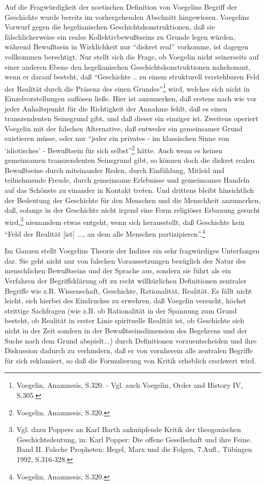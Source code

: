 Auf die Fragwürdigkeit der noetischen Definition von Voegelins Begriff der
Geschichte wurde bereits im vorhergehenden Abschnitt hingewiesen. Voegelins
Vorwurf gegen die hegelianischen Geschichtskonstruktionen, daß sie
fälschlicherweise ein reales Kollektivbewußtseins zu Grunde legen würden,
während Bewußtsein in Wirklichkeit nur "`diskret real"' vorkomme, ist dagegen
vollkommen berechtigt. Nur stellt sich die Frage, ob Voegelin nicht
seinerseits auf einer anderen Ebene den hegelianischen
Geschichtskonstruktionen nahekommt, wenn er darauf besteht, daß "`Geschichte
.. zu einem strukturell verstehbaren Feld der Realität durch die Präsenz des
einen Grundes"'\footnote{Voegelin, Anamnesis, S.320. - Vgl. auch Voegelin,
  Order and History IV, S.305.} wird, welches sich nicht in
Einzelvorstellungen auflösen ließe. Hier ist anzumerken, daß erstens nach wie
vor jeder Anhaltspunkt für die Richtigkeit der Annahme fehlt, daß es einen
transzendenten Seinsgrund gibt, und daß dieser ein einziger ist. Zweitens
operiert Voegelin mit der falschen Alternative, daß entweder ein gemeinsamer
Grund existieren müsse, oder nur "`jeder ein privates - im klassischen Sinne
von `idiotisches' - Bewußtsein für sich selbst"'\footnote{Voegelin, Anamnesis,
  S.320.} hätte. Auch wenn es keinen gemeinsamen transzendenten Seinsgrund
gibt, so können doch die diskret realen Bewußtseine durch miteinander Reden,
durch Einfühlung, Mitleid und teilnehmende Freude, durch gemeinsame Erlebnisse
und gemeinsames Handeln auf das Schönste zu einander in Kontakt treten. Und
drittens bleibt hinsichtlich der Bedeutung der Geschichte für den Menschen und
die Menschheit anzumerken, daß, solange in der Geschichte nicht irgend eine
Form religiöser Erbauung gesucht wird,\footnote{Vgl. dazu Poppers an Karl
  Barth anknüpfende Kritik der theogonischen Geschichtsdeutung, in: Karl
  Popper: Die offene Gesellschaft und ihre Feine. Band II. Falsche Propheten:
  Hegel, Marx und die Folgen, 7.Aufl., Tübingen 1992, S.316-328.} niemandem
etwas entgeht, wenn sich herausstellt, daß Geschichte kein "`Feld der Realität
[ist] ..., an dem alle Menschen partizipieren"'.\footnote{Voegelin, Anamnesis,
  S.320.}

Im Ganzen stellt Voegelins Theorie der Indizes ein sehr fragwürdiges
Unterfangen dar. Sie geht nicht nur von falschen Voraussetzungen bezüglich der
Natur des menschlichen Bewußtseins und der Sprache aus, sondern sie führt als
ein Verfahren der Begriffsklärung oft zu recht willkürlichen Definitionen
zentraler Begriffe wie z.B. Wissenschaft, Geschichte, Rationalität, Realität.
Es fällt nicht leicht, sich hierbei des Eindruckes zu erwehren, daß Voegelin
versucht, höchst strittige Sachfragen (wie z.B. ob Rationalität in der
Spannung zum Grund besteht, ob Realität in erster Linie spirituelle Realität
ist, ob Geschichte sich nicht in der Zeit sondern in der Bewußtseinsdimension
des Begehrens und der Suche nach dem Grund abspielt...)  durch Definitionen
vorzuentscheiden und ihre Diskussion dadurch zu verhindern, daß er von
vornherein alle zentralen Begriffe für sich reklamiert, so daß die
Formulierung von Kritik erheblich erschwert wird.

